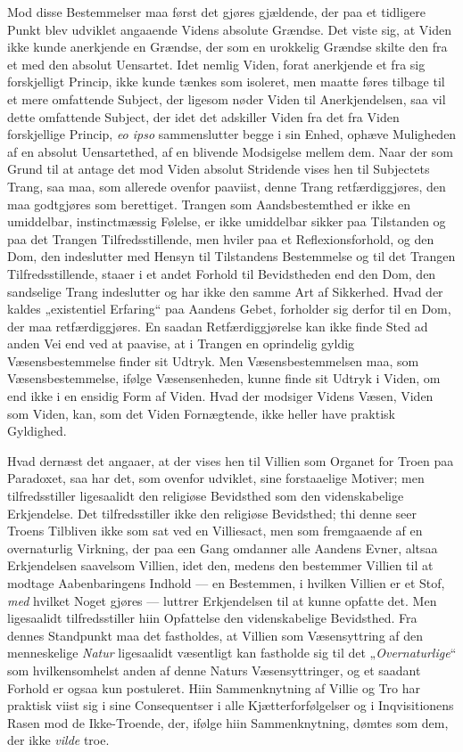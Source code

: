 \documentclass[12pt,a4paper]{book}
\newcommand{\opage}[1]{\marginnote{\footnotesize\textit{[#1]}}}
\begin{document}
Mod disse Bestemmelser maa først det gjøres gjældende, der paa et tidligere Punkt blev
udviklet angaaende Videns absolute Grændse. Det viste sig, at Viden ikke kunde anerkjende en
Grændse, der som en urokkelig Grændse \opage{169}skilte den fra et med den absolut Uensartet. Idet
nemlig Viden, forat anerkjende et fra sig forskjelligt Princip, ikke kunde tænkes som
isoleret, men maatte føres tilbage til et mere omfattende Subject, der ligesom nøder Viden
til Anerkjendelsen, saa vil dette omfattende Subject, der idet det adskiller Viden fra det
fra Viden forskjellige Princip, \textit{eo ipso} sammenslutter begge i sin Enhed, ophæve
Muligheden af en absolut Uensartethed, af en blivende Modsigelse mellem dem. Naar der som
Grund til at antage det mod Viden absolut Stridende vises hen til Subjectets Trang, saa maa,
som allerede ovenfor paaviist, denne Trang retfærdiggjøres, den maa godtgjøres som berettiget.
Trangen som Aandsbestemthed er ikke en umiddelbar, instinctmæssig Følelse, er ikke umiddelbar
sikker paa Tilstanden og paa det Trangen Tilfredsstillende, men hviler paa et
Reflexionsforhold, og den Dom, den indeslutter med Hensyn til Tilstandens Bestemmelse og til
det Trangen Tilfredsstillende, staaer i et andet Forhold til Bevidstheden end den Dom, den
sandselige Trang indeslutter og har ikke den samme Art af Sikkerhed. Hvad der kaldes
„existentiel Erfaring“ paa Aandens Gebet, forholder sig derfor til en Dom, der maa
retfærdiggjøres. En saadan Retfærdiggjørelse kan ikke finde Sted ad anden Vei end ved at
paavise, at i Trangen en oprindelig gyldig Væsensbestemmelse finder sit Udtryk. Men
Væsensbestemmelsen maa, som Væsensbestemmelse, ifølge Væsensenheden, kunne finde sit Udtryk i
Viden, om end ikke i en ensidig Form af Viden. Hvad der modsiger Videns Væsen, Viden som
Viden, kan, som det Viden Fornægtende, ikke heller have praktisk Gyldighed.

Hvad dernæst det angaaer, at der vises hen til Villien som Organet for Troen paa Paradoxet,
saa har det, som ovenfor udviklet, sine forstaaelige Motiver; men tilfredsstiller ligesaalidt
den religiøse Bevidsthed som den videnskabelige Erkjendelse. Det tilfredsstiller ikke den
religiøse Bevidsthed; thi denne seer Troens Tilbliven ikke som sat ved en Villiesact, men som
fremgaaende af en overnaturlig Virkning, der paa een Gang omdanner alle Aandens Evner, \opage{170}altsaa
Erkjendelsen saavelsom Villien, idet den, medens den bestemmer Villien til at modtage
Aabenbaringens Indhold --- en Bestemmen, i hvilken Villien er et Stof, \emph{med} hvilket Noget
gjøres --- luttrer Erkjendelsen til at kunne opfatte det. Men ligesaalidt tilfredsstiller hiin
Opfattelse den videnskabelige Bevidsthed. Fra dennes Standpunkt maa det fastholdes, at
Villien som Væsensyttring af den menneskelige \emph{Natur} ligesaalidt væsentligt kan fastholde sig
til det „\emph{Overnaturlige}“ som hvilkensomhelst anden af denne Naturs Væsensyttringer, og et
saadant Forhold er ogsaa kun postuleret. Hiin Sammenknytning af Villie og Tro har praktisk
viist sig i sine Consequentser i alle Kjætterforfølgelser og i Inqvisitionens Rasen mod de
Ikke-Troende, der, ifølge hiin Sammenknytning, dømtes som dem, der ikke \emph{vilde} troe.
\end{document}
